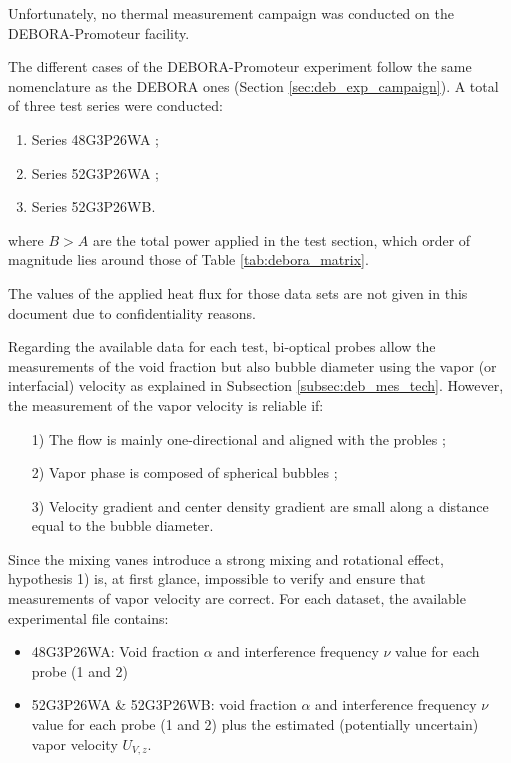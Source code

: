 \begin{note*}{}
Unfortunately, no thermal measurement campaign was conducted on the DEBORA-Promoteur facility.
\end{note*}

\npar


The different cases of the DEBORA-Promoteur experiment follow the same nomenclature as the DEBORA ones (Section \ref{sec:deb_exp_campaign}). A total of three test series were conducted:

\begin{enumerate}
\item Series 48G3P26WA ;
\item Series 52G3P26WA ; 
\item Series 52G3P26WB.
\end{enumerate}
where $B > A$ are the total power applied in the test section, which order of magnitude lies around those of Table \ref{tab:debora_matrix}.

\begin{note*}{}
The values of the applied heat flux for those data sets are not given in this document due to confidentiality reasons.
\end{note*}


Regarding the available data for each test, bi-optical probes allow the measurements of the void fraction but also bubble diameter using the vapor (or interfacial) velocity as explained in Subsection \ref{subsec:deb_mes_tech}. However, the measurement of the vapor velocity is reliable if:
\begin{enumerate}
\item[1)] The flow is mainly one-directional and aligned with the probles ;
\item[2)] Vapor phase is composed of spherical bubbles ;
\item[3)] Velocity gradient and center density gradient are small along a distance equal to the bubble diameter.
\end{enumerate}

Since the mixing vanes introduce a strong mixing and rotational effect, hypothesis 1) is, at first glance, impossible to verify and ensure that measurements of vapor velocity are correct. For each dataset, the available experimental file contains:

\begin{itemize}
\item 48G3P26WA: Void fraction $\alpha$ and interference frequency $\nu$ value for each probe (1 and 2)
\item 52G3P26WA \& 52G3P26WB: void fraction $\alpha$ and interference frequency $\nu$ value for each probe (1 and 2) plus the estimated (potentially uncertain) vapor velocity $U_{V,z}$.
\end{itemize}


